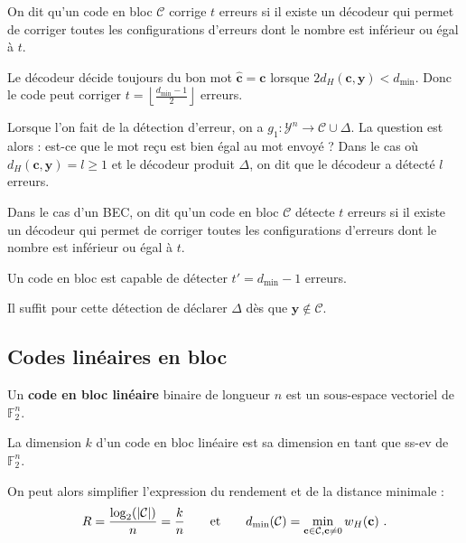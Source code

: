 	\begin{voc}
		On dit qu'un code en bloc $\mathcal{C}$ corrige $t$ erreurs si il existe un décodeur qui permet de corriger toutes les configurations d'erreurs dont le nombre est inférieur ou égal à $t$.
	\end{voc}

	\begin{pop}
		Le décodeur décide toujours du bon mot $\mathbf{\hat{c}} = \mathbf{c}$ lorsque $2 d_H(\mathbf{c},\mathbf{y}) < d_{\min}$.
		Donc le code peut corriger $t = \left\lfloor \frac{d_{\min} - 1}{2} \right\rfloor$ erreurs.
	\end{pop}

	Lorsque l'on fait de la détection d'erreur, on a $g_1 \colon \mathcal{Y}^n \to \mathcal{C} \cup \Delta$.
	La question est alors : est-ce que le mot reçu est bien égal au mot envoyé ?
	Dans le cas où $d_H(\mathbf{c},\mathbf{y}) = l \geq 1$ et le décodeur produit $\Delta$, on dit que le décodeur a détecté $l$ erreurs.

	\begin{voc}
		Dans le cas d'un BEC, on dit qu'un code en bloc $\mathcal{C}$ détecte $t$ erreurs si il existe un décodeur qui permet de corriger toutes les configurations d'erreurs dont le nombre est inférieur ou égal à $t$.
	\end{voc}

	\begin{pop}
		Un code en bloc est capable de détecter $t' = d_{\min} - 1$ erreurs.
	\end{pop}
	Il suffit pour cette détection de déclarer $\Delta$ dès que $\mathbf{y} \not\in \mathcal{C}$.


\subsection{Codes linéaires en bloc}

	\begin{defn}
		Un \textbf{code en bloc linéaire} binaire de longueur $n$ est un sous-espace vectoriel de $\mathbb{F}_2^n$.
	\end{defn}

	\begin{defn}
		La dimension $k$ d'un code en bloc linéaire est sa dimension en tant que ss-ev de $\mathbb{F}_2^n$.
	\end{defn}

	On peut alors simplifier l'expression du rendement et de la distance minimale :
	$$R = \frac{\log_2(\left\lvert\mathcal{C}\right\rvert)}{n} = \frac{k}{n}
	\qquad \text{et} \qquad
	d_{\min}(\mathcal{C}) = \min_{\mathbf{c} \in \mathcal{C}, \mathbf{c} \neq 0} w_H(\mathbf{c})\ .$$

